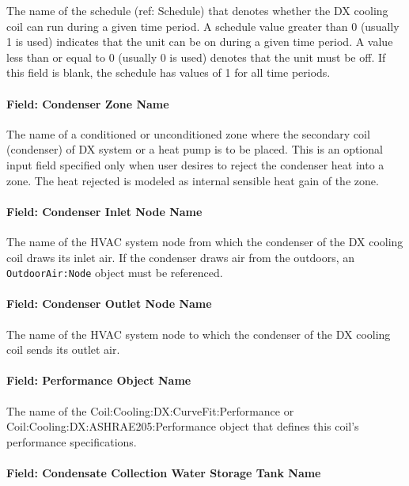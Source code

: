 The name of the schedule (ref: Schedule) that denotes whether the DX cooling coil can run during a given time period. A schedule value greater than 0 (usually 1 is used) indicates that the unit can be on during a given time period. A value less than or equal to 0 (usually 0 is used) denotes that the unit must be off. If this field is blank, the schedule has values of 1 for all time periods.

\paragraph{Field: Condenser Zone Name}\label{field-condenser-zone-name-6-001}

The name of a conditioned or unconditioned zone where the secondary coil (condenser) of DX system or a heat pump is to be placed. This is an optional input field specified only when user desires to reject the condenser heat into a zone. The heat rejected is modeled as internal sensible heat gain of the zone.

\paragraph{Field: Condenser Inlet Node Name}\label{field-condenser-inlet-node-name-6-001}

The name of the HVAC system node from which the condenser of the DX cooling coil draws its inlet air. If the condenser draws air from the outdoors, an \texttt{OutdoorAir:Node} object must be referenced.

\paragraph{Field: Condenser Outlet Node Name}\label{field-condenser-outlet-node-name-6-001}

The name of the HVAC system node to which the condenser of the DX cooling coil sends its outlet air.

\paragraph{Field: Performance Object Name}\label{field-performance-object-name-6-001}

The name of the Coil:Cooling:DX:CurveFit:Performance or Coil:Cooling:DX:ASHRAE205:Performance object that defines this coil's performance specifications.

\paragraph{Field: Condensate Collection Water Storage Tank Name}

